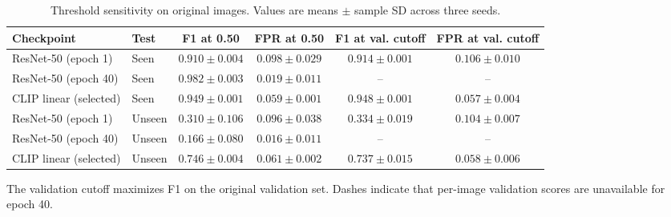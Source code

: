 \begin{table}[!htbp]\centering\resulttable
\caption{Threshold sensitivity on original images. Values are means $\pm$ sample SD across three seeds.}\label{tab:sensitivity}
\begin{tabularx}{\linewidth}{@{}llCCCC@{}}\toprule
Checkpoint & Test & F1 at 0.50 & FPR at 0.50 & F1 at val. cutoff & FPR at val. cutoff\\\midrule
ResNet-50 (epoch 1) & Seen & $0.910\pm 0.004$ & $0.098\pm 0.029$ & $0.914\pm 0.001$ & $0.106\pm 0.010$\\
ResNet-50 (epoch 40) & Seen & $0.982\pm 0.003$ & $0.019\pm 0.011$ & -- & --\\
CLIP linear (selected) & Seen & $0.949\pm 0.001$ & $0.059\pm 0.001$ & $0.948\pm 0.001$ & $0.057\pm 0.004$\\
ResNet-50 (epoch 1) & Unseen & $0.310\pm 0.106$ & $0.096\pm 0.038$ & $0.334\pm 0.019$ & $0.104\pm 0.007$\\
ResNet-50 (epoch 40) & Unseen & $0.166\pm 0.080$ & $0.016\pm 0.011$ & -- & --\\
CLIP linear (selected) & Unseen & $0.746\pm 0.004$ & $0.061\pm 0.002$ & $0.737\pm 0.015$ & $0.058\pm 0.006$\\
\bottomrule\end{tabularx}
\par\smallskip\parbox{\linewidth}{\footnotesize The validation cutoff maximizes F1 on the original validation set. Dashes indicate that per-image validation scores are unavailable for epoch 40.}
\end{table}
